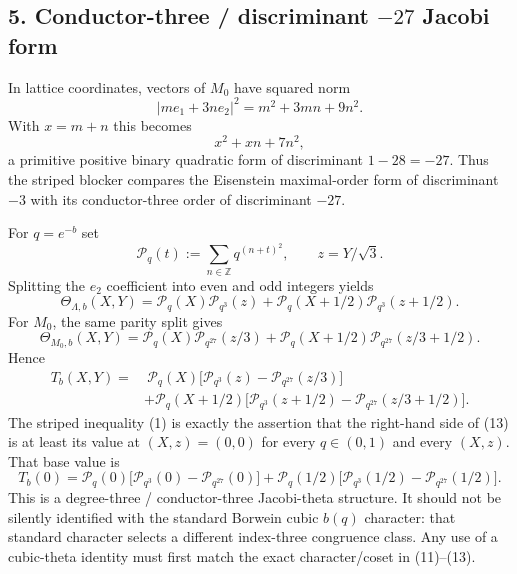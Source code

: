 \subsection*{5. Conductor-three / discriminant $-27$ Jacobi form}
In lattice coordinates, vectors of $M_0$ have squared norm
\[
 |me_1+3ne_2|^2=m^2+3mn+9n^2.
\]
With $x=m+n$ this becomes
\[
 \boxed{x^2+xn+7n^2,}\tag{10}
\]
a primitive positive binary quadratic form of discriminant $1-28=-27$.  Thus the striped blocker compares the Eisenstein maximal-order form of discriminant $-3$ with its conductor-three order of discriminant $-27$.

For $q=e^{-b}$ set
\[
 \mathcal P_q(t):=\sum_{n\in\mathbb Z}q^{(n+t)^2},\qquad z=Y/\sqrt3.
\]
Splitting the $e_2$ coefficient into even and odd integers yields
\[
 \boxed{
 \Theta_{\Lambda,b}(X,Y)
 =\mathcal P_q(X)\mathcal P_{q^3}(z)
 +\mathcal P_q(X+1/2)\mathcal P_{q^3}(z+1/2).}\tag{11}
\]
For $M_0$, the same parity split gives
\[
 \boxed{
 \Theta_{M_0,b}(X,Y)
 =\mathcal P_q(X)\mathcal P_{q^{27}}(z/3)
 +\mathcal P_q(X+1/2)\mathcal P_{q^{27}}(z/3+1/2).}\tag{12}
\]
Hence
\[
 \boxed{
 \begin{aligned}
 T_b(X,Y)=&\ \mathcal P_q(X)
 \big[\mathcal P_{q^3}(z)-\mathcal P_{q^{27}}(z/3)\big]\\
 &+\mathcal P_q(X+1/2)
 \big[\mathcal P_{q^3}(z+1/2)-\mathcal P_{q^{27}}(z/3+1/2)\big].
 \end{aligned}}\tag{13}
\]
The striped inequality (1) is exactly the assertion that the right-hand side of (13) is at least its value at $(X,z)=(0,0)$ for every $q\in(0,1)$ and every $(X,z)$.  That base value is
\[
 T_b(0)=\mathcal P_q(0)\big[\mathcal P_{q^3}(0)-\mathcal P_{q^{27}}(0)\big]
 +\mathcal P_q(1/2)\big[\mathcal P_{q^3}(1/2)-\mathcal P_{q^{27}}(1/2)\big].\tag{14}
\]
This is a degree-three / conductor-three Jacobi-theta structure.  It should not be silently identified with the standard Borwein cubic $b(q)$ character: that standard character selects a different index-three congruence class.  Any use of a cubic-theta identity must first match the exact character/coset in (11)--(13).

